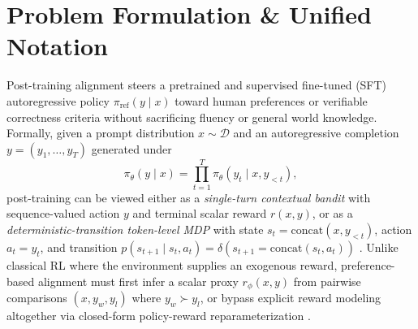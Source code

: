 \documentclass[../../../../master.tex]{subfiles}
\begin{document}

\section{Problem Formulation \& Unified Notation}
\label{sec:align:formulation}

Post-training alignment steers a pretrained and supervised fine-tuned (SFT) autoregressive policy $\pi_{\mathrm{ref}}(y \mid x)$ toward human preferences or verifiable correctness criteria without sacrificing fluency or general world knowledge. Formally, given a prompt distribution $x \sim \mathcal{D}$ and an autoregressive completion $y = (y_1, \dots, y_T)$ generated under
\begin{equation}
\label{eq:align:ar_factorization}
\pi_\theta(y \mid x) = \prod_{t=1}^{T} \pi_\theta(y_t \mid x, y_{<t}),
\end{equation}
post-training can be viewed either as a \emph{single-turn contextual bandit} with sequence-valued action $y$ and terminal scalar reward $r(x,y)$, or as a \emph{deterministic-transition token-level MDP} with state $s_t = \mathrm{concat}(x, y_{<t})$, action $a_t = y_t$, and transition $p(s_{t+1} \mid s_t, a_t) = \delta(s_{t+1} = \mathrm{concat}(s_t, a_t))$ . Unlike classical RL where the environment supplies an exogenous reward, preference-based alignment must first infer a scalar proxy $r_\phi(x,y)$ from pairwise comparisons $(x, y_w, y_l)$ where $y_w \succ y_l$, or bypass explicit reward modeling altogether via closed-form policy-reward reparameterization .
\end{document}

